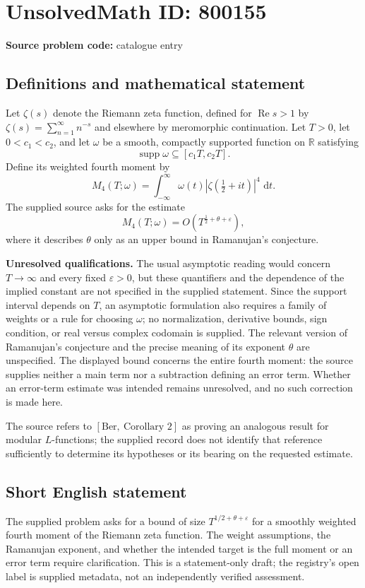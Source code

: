 \documentclass[11pt]{article}
\newcommand{\R}{\mathbb{R}}
\newcommand{\dd}{\,\mathrm{d}}
\begin{document}
\section*{UnsolvedMath ID: 800155}
\textbf{Source problem code:} catalogue entry
\subsection{Definitions and mathematical statement}
Let \(\zeta(s)\) denote the Riemann zeta function, defined for \(\operatorname{Re}s>1\) by \(\zeta(s)=\sum_{n=1}^{\infty}n^{-s}\) and elsewhere by meromorphic continuation. Let \(T>0\), let \(0<c_1<c_2\), and let \(\omega\) be a smooth, compactly supported function on \(\R\) satisfying
\[
\operatorname{supp}\omega\subseteq[c_1T,c_2T].
\]
Define its weighted fourth moment by
\[
M_4(T;\omega)=\int_{-\infty}^{\infty}\omega(t)\left|\zeta\!\left(\tfrac12+it\right)\right|^4\,\dd t.
\]
The supplied source asks for the estimate
\[
M_4(T;\omega)=O\!\left(T^{\frac12+\theta+\varepsilon}\right),
\]
where it describes \(\theta\) only as an upper bound in Ramanujan's conjecture.

\textbf{Unresolved qualifications.} The usual asymptotic reading would concern \(T\to\infty\) and every fixed \(\varepsilon>0\), but these quantifiers and the dependence of the implied constant are not specified in the supplied statement. Since the support interval depends on \(T\), an asymptotic formulation also requires a family of weights or a rule for choosing \(\omega\); no normalization, derivative bounds, sign condition, or real versus complex codomain is supplied. The relevant version of Ramanujan's conjecture and the precise meaning of its exponent \(\theta\) are unspecified. The displayed bound concerns the entire fourth moment: the source supplies neither a main term nor a subtraction defining an error term. Whether an error-term estimate was intended remains unresolved, and no such correction is made here.

The source refers to \([\mathrm{Ber},\ \text{Corollary }2]\) as proving an analogous result for modular \(L\)-functions; the supplied record does not identify that reference sufficiently to determine its hypotheses or its bearing on the requested estimate.
\subsection{Short English statement}
The supplied problem asks for a bound of size \(T^{1/2+\theta+\varepsilon}\) for a smoothly weighted fourth moment of the Riemann zeta function. The weight assumptions, the Ramanujan exponent, and whether the intended target is the full moment or an error term require clarification. This is a statement-only draft; the registry's open label is supplied metadata, not an independently verified assessment.
\end{document}
